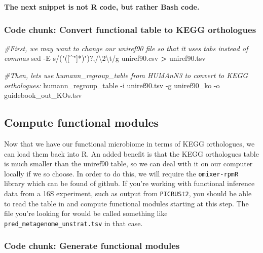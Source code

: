 \documentclass[
]{article}
\newenvironment{Shaded}{\begin{snugshade}}{\end{snugshade}}
\newcommand{\AttributeTok}[1]{\textcolor[rgb]{0.77,0.63,0.00}{#1}}
\newcommand{\CommentTok}[1]{\textcolor[rgb]{0.56,0.35,0.01}{\textit{#1}}}
\newcommand{\ExtensionTok}[1]{#1}
\newcommand{\FunctionTok}[1]{\textcolor[rgb]{0.00,0.00,0.00}{#1}}
\newcommand{\NormalTok}[1]{#1}
\newcommand{\OperatorTok}[1]{\textcolor[rgb]{0.81,0.36,0.00}{\textbf{#1}}}
\newcommand{\StringTok}[1]{\textcolor[rgb]{0.31,0.60,0.02}{#1}}
\begin{document}
\textbf{The next snippet is not R code, but rather Bash code.}

\hypertarget{code-chunk-convert-functional-table-to-kegg-orthologues}{%
\subsubsection{Code chunk: Convert functional table to KEGG
orthologues}\label{code-chunk-convert-functional-table-to-kegg-orthologues}}

\begin{Shaded}
\begin{Highlighting}[]

\CommentTok{\#First, we may want to change our uniref90 file so that it uses tabs instead of commas}
\FunctionTok{sed} \AttributeTok{{-}E} \StringTok{\textquotesingle{}s/("([\^{}"]*)")?,/\textbackslash{}2\textbackslash{}t/g\textquotesingle{}}\NormalTok{ uniref90.csv  }\OperatorTok{\textgreater{}}\NormalTok{ uniref90.tsv}

\CommentTok{\#Then, let\textquotesingle{}s use humann\_regroup\_table from HUMAnN3 to convert to KEGG orthologues:}
\ExtensionTok{humann\_regroup\_table} \AttributeTok{{-}i}\NormalTok{ uniref90.tsv }\AttributeTok{{-}g}\NormalTok{ uniref90\_ko }\AttributeTok{{-}o}\NormalTok{ guidebook\_out\_KOs.tsv}
\end{Highlighting}
\end{Shaded}

\newpage

\hypertarget{compute-functional-modules}{%
\subsection{Compute functional
modules}\label{compute-functional-modules}}

Now that we have our functional microbiome in terms of KEGG orthologues,
we can load them back into R. An added benefit is that the KEGG
orthologues table is much smaller than the uniref90 table, so we can
deal with it on our computer locally if we so choose. In order to do
this, we will require the \texttt{omixer-rpmR} library which can be
found of github. If you're working with functional inference data from a
16S experiment, such as output from \texttt{PICRUSt2}, you should be
able to read the table in and compute functional modules starting at
this step. The file you're looking for would be called something like
\texttt{pred\_metagenome\_unstrat.tsv} in that case.

\hypertarget{code-chunk-generate-functional-modules}{%
\subsubsection{Code chunk: Generate functional
modules}\label{code-chunk-generate-functional-modules}}
\end{document}
